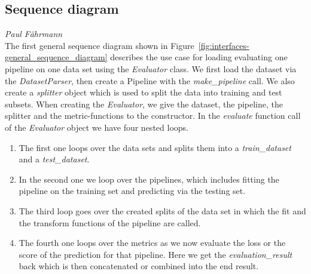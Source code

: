 \subsection*{Sequence diagram}
\vspace*{-10mm}\hfill{\normalsize\emph{Paul Fährmann}}
\\
The first general sequence diagram shown in Figure~\ref{fig:interfaces-general_sequence_diagram} describes the use case for loading evaluating one pipeline on one data set using the \textit{Evaluator} class. We first load the dataset via the \textit{DatasetParser}, then create a Pipeline with the \textit{make\_pipeline} call. We also create a \textit{splitter} object which is used to split the data into training and test subsets. When creating the \textit{Evaluator}, we give the dataset, the pipeline, the splitter and the metric-functions to the constructor. In the \textit{evaluate} function call of the \textit{Evaluator} object we have four nested loops.
\begin{enumerate}
    \item The first one loops over the data sets and splits them into a \textit{train\_dataset} and a \textit{test\_dataset}.
    \item In the second one we loop over the pipelines, which includes fitting the pipeline on the training set and predicting via the testing set.
    \item The third loop goes over the created splits of the data set in which the fit and the transform functions of the pipeline are called.
    \item The fourth one loops over the metrics as we now evaluate the loss or the score of the prediction for that pipeline. Here we get the \textit{evaluation\_result} back which is then concatenated or combined into the end result.
\end{enumerate}

